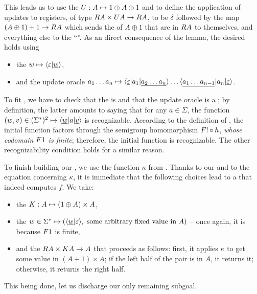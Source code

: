 This leads us to use the  $\functoru : A \mapsto 1 \oplus A \oplus
1$ and to define the application of updates to registers, of type $\functorr A
\times \functoru A \to \functorr A$, to be $\delta$ followed by the map $(A
\oplus 1) + 1 \to \functorr A$ which sends the  of $A \oplus 1$ that
are in $\functorr A$ to themselves, and everything else to the \enquote{}. As an direct consequence of the lemma, the desired  holds using
\begin{itemize}
  \item the  $w \mapsto \langle \varepsilon|\underline{w} \rangle$,
  \item and the update oracle $a_1 \dots a_n \mapsto \langle \underline\varepsilon|a_1|\underline{a_2 \dots a_n} \rangle \dots
  \langle \underline{a_1 \dots a_{n-1}}|a_n|\underline\varepsilon \rangle$.
\end{itemize}
To fit , we have to check that the  is  and that the update oracle is a ; by definition, the latter amounts to saying that for any $a\in\Sigma$, the function $(w,v) \in (\Sigma^*)^2 \mapsto \langle \underline{w}|a|\underline{v} \rangle$ is recognizable. According to the definition of , the initial function factors through the semigroup homomorphism $\functor! \circ h$, \emph{whose codomain $\functor1$ is finite}; therefore, the initial function is recognizable. The other recognizability condition holds for a similar reason.

To finish building our , we use the
function $\kappa$ from . Thanks to our
 and to the equation concerning $\kappa$, it is immediate that the
following choices lead to a \functorialsst that indeed computes $f$. We take:
\begin{itemize}
\item the  $\functork : A \mapsto (1 \oplus A)\times A$,
\item the  $w\in\Sigma^* \mapsto
  (\langle \underline{w}|\varepsilon \rangle,\;\text{some arbitrary fixed value in
    $A$})$ -- once again, it is  because $\functor1$ is finite,
\item and the  $\functorr A \times \functork A \to A$ that
  proceeds as follows: first, it applies $\kappa$ to get some value in
  $(A+1)\times A$; if the left half of the pair is in $A$, it returns it;
  otherwise, it returns the right half.
\end{itemize}
This being done, let us discharge our only remaining subgoal.

